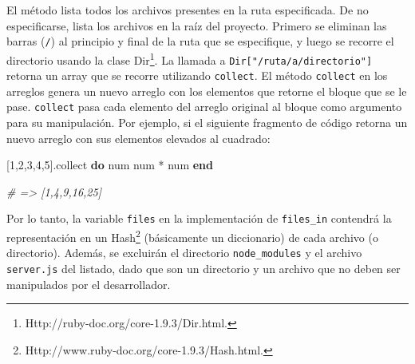 \documentclass[12pt,titlepage,]{article}
\newenvironment{Shaded}{}{}
\newcommand{\KeywordTok}[1]{\textcolor[rgb]{0.00,0.44,0.13}{\textbf{{#1}}}}
\newcommand{\DataTypeTok}[1]{\textcolor[rgb]{0.56,0.13,0.00}{{#1}}}
\newcommand{\DecValTok}[1]{\textcolor[rgb]{0.25,0.63,0.44}{{#1}}}
\newcommand{\StringTok}[1]{\textcolor[rgb]{0.25,0.44,0.63}{{#1}}}
\newcommand{\CommentTok}[1]{\textcolor[rgb]{0.38,0.63,0.69}{\textit{{#1}}}}
\newcommand{\OtherTok}[1]{\textcolor[rgb]{0.00,0.44,0.13}{{#1}}}
\newcommand{\NormalTok}[1]{{#1}}
\begin{document}
\begin{Shaded}
\end{Shaded}

El método lista todos los archivos presentes en la ruta especificada. De
no especificarse, lista los archivos en la raíz del proyecto. Primero se
eliminan las barras (\texttt{/}) al principio y final de la ruta que se
especifique, y luego se recorre el directorio usando la clase
Dir\footnote{Http://ruby-doc.org/core-1.9.3/Dir.html.}. La llamada a
\texttt{Dir{[}"/ruta/a/directorio"{]}} retorna un array que se recorre
utilizando \texttt{collect}. El método \texttt{collect} en los arreglos
genera un nuevo arreglo con los elementos que retorne el bloque que se
le pase. \texttt{collect} pasa cada elemento del arreglo original al
bloque como argumento para su manipulación. Por ejemplo, si el siguiente
fragmento de código retorna un nuevo arreglo con sus elementos elevados
al cuadrado:

\begin{Shaded}
\begin{Highlighting}[]
\NormalTok{[}\DecValTok{1}\NormalTok{,}\DecValTok{2}\NormalTok{,}\DecValTok{3}\NormalTok{,}\DecValTok{4}\NormalTok{,}\DecValTok{5}\NormalTok{].collect }\KeywordTok{do} \NormalTok{\textbar{}num\textbar{}}
  \NormalTok{num * num}
\KeywordTok{end}

\CommentTok{# => [1,4,9,16,25]}
\end{Highlighting}
\end{Shaded}

Por lo tanto, la variable \texttt{files} en la implementación de
\texttt{files\_in} contendrá la representación en un Hash\footnote{Http://www.ruby-doc.org/core-1.9.3/Hash.html.}
(básicamente un diccionario) de cada archivo (o directorio). Además, se
excluirán el directorio \texttt{node\_modules} y el archivo
\texttt{server.js} del listado, dado que son un directorio y un archivo
que no deben ser manipulados por el desarrollador.
\end{document}
